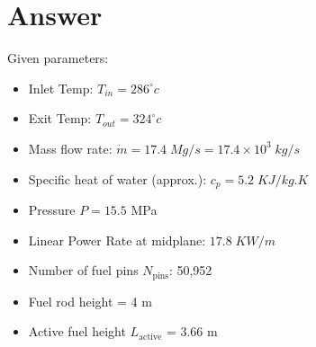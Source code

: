 \documentclass[12pt]{article}
\begin{document}
\section*{Answer}
Given parameters:
\begin{itemize}
    \item Inlet Temp: $T_{in} = 286^{\circ} c$
    \item Exit Temp:  $T_{out} = 324^{\circ} c$
    \item Mass flow rate: $\dot{m} = 17.4 \; Mg/s = 17.4 \times 10^3 \; kg/s$
    \item Specific heat of water (approx.): $c_p = 5.2 \; KJ/kg.K$
    \item Pressure $P=15.5$ MPa
    \item Linear Power Rate at midplane: $17.8 \; KW/m$
    \item Number of fuel pins $N_{\mathrm{pins}}$: 50,952
    \item Fuel rod height = 4 m
    \item Active fuel height $L_{\mathrm{active}}$ = 3.66 m
\end{itemize}
\end{document}
